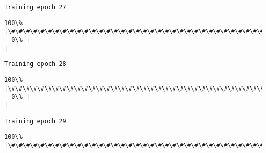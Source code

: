 \documentclass[11pt]{article}
\begin{document}
    \begin{Verbatim}[commandchars=\\\{\}]
Training epoch 27

    \end{Verbatim}

    \begin{Verbatim}[commandchars=\\\{\}]
100\% |\#\#\#\#\#\#\#\#\#\#\#\#\#\#\#\#\#\#\#\#\#\#\#\#\#\#\#\#\#\#\#\#\#\#\#\#\#\#\#\#\#\#\#\#\#\#\#\#\#\#\#\#\#\#\#\#\#\#\#\#\#\#\#\#\#\#\#\#\#\#\#\#|
  0\% |                                                                        |
    \end{Verbatim}

    \begin{Verbatim}[commandchars=\\\{\}]
Training epoch 28

    \end{Verbatim}

    \begin{Verbatim}[commandchars=\\\{\}]
100\% |\#\#\#\#\#\#\#\#\#\#\#\#\#\#\#\#\#\#\#\#\#\#\#\#\#\#\#\#\#\#\#\#\#\#\#\#\#\#\#\#\#\#\#\#\#\#\#\#\#\#\#\#\#\#\#\#\#\#\#\#\#\#\#\#\#\#\#\#\#\#\#\#|
  0\% |                                                                        |
    \end{Verbatim}

    \begin{Verbatim}[commandchars=\\\{\}]
Training epoch 29

    \end{Verbatim}

    \begin{Verbatim}[commandchars=\\\{\}]
100\% |\#\#\#\#\#\#\#\#\#\#\#\#\#\#\#\#\#\#\#\#\#\#\#\#\#\#\#\#\#\#\#\#\#\#\#\#\#\#\#\#\#\#\#\#\#\#\#\#\#\#\#\#\#\#\#\#\#\#\#\#\#\#\#\#\#\#\#\#\#\#\#\#|

    \end{Verbatim}
\end{document}

